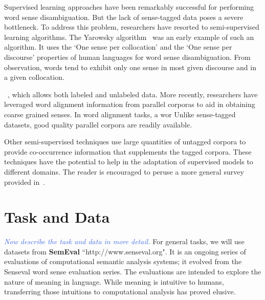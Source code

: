\documentclass[11pt,letterpaper]{article}
\newcommand{\blue}[1]{\textcolor{RoyalBlue}{#1}}
\newcommand{\instructions}[1]{\blue{\textit{#1}}}
\begin{document}
Supervised learning approaches have been remarkably successful for performing word sense disambiguation. But the lack of sense-tagged data poses a severe bottleneck. To address this problem, researchers have resorted to semi-supervised learning algorithms. The Yarowsky algorithm~\cite{yarowsky1995unsupervised} was an early example of such an algorithm. It uses the `One sense per collocation' and the `One sense per discourse' properties of human languages for word sense disambiguation. From observation, words tend to exhibit only one sense in most given discourse and in a given collocation. 

~\cite{le2008semi}, which allows both labeled and unlabeled data. 
More recently, researchers have leveraged word alignment information from parallel corporas to aid in obtaining coarse grained senses. In word alignment tasks, a wor 
Unlike sense-tagged datasets, good quality parallel corpora are readily available. 


Other semi-supervised techniques use large quantities of untagged corpora to provide co-occurrence information that supplements the tagged corpora. These techniques have the potential to help in the adaptation of supervised models to different domains. The reader is encouraged to peruse a more general  survey provided in~\cite{navigli2009word}. 

\section{Task and Data}
\label{sec:taskAndData}
\instructions{Now describe the task and data in more detail.}
For general tasks, we will use datasets from \textbf{SemEval} ``http://www.senseval.org". It is an ongoing series of evaluations of computational semantic analysis systems; it evolved from the Senseval word sense evaluation series. The evaluations are intended to explore the nature of meaning in language. While meaning is intuitive to humans, transferring those intuitions to computational analysis has proved elusive.
\end{document}
